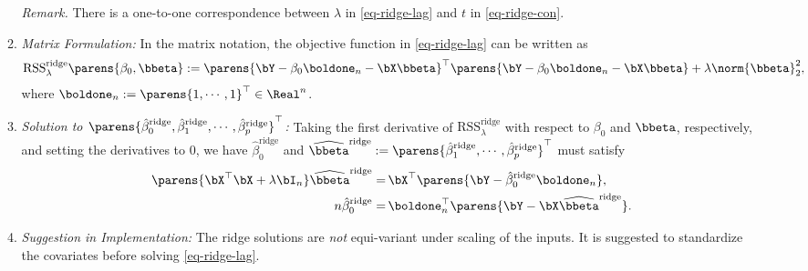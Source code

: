\documentclass[12pt]{article}
\begin{document}
\begin{enumerate}[label=\textbf{\arabic*.}]
\begin{enumerate}
		\textit{Remark.} There is a one-to-one correspondence between $\lambda$ in \eqref{eq-ridge-lag} and $t$ in \eqref{eq-ridge-con}. 
		
		\item \textit{Matrix Formulation:} In the matrix notation, the objective function in \eqref{eq-ridge-lag} can be written as 
		\begin{align}\label{eq-ridge-mat1}
			\mathrm{RSS}_{\lambda}^{\mathrm{ridge}} \parens{\beta_0, \bbeta} := \parens{\bY - \beta_0 \boldone_n - \bX \bbeta}^\top \parens{\bY - \beta_0 \boldone_n - \bX \bbeta} + \lambda \norm{\bbeta}_2^2, 
		\end{align}
		where $\boldone_n := \parens{1, \cdots, 1}^\top \in \Real^n$. 
		
		\item \textit{Solution to $\parens{\hat{\beta}^{\mathrm{ridge}}_0, \hat{\beta}^{\mathrm{ridge}}_1, \cdots, \hat{\beta}^{\mathrm{ridge}}_p}^\top$:} Taking the first derivative of $\mathrm{RSS}_{\lambda}^{\mathrm{ridge}}$ with respect to $\beta_0$ and $\bbeta$, respectively, and setting the derivatives to 0, we have $\hat{\beta}^{\mathrm{ridge}}_{0}$ and $\widehat{\bbeta}^{\mathrm{ridge}} := \parens{\hat{\beta}^{\mathrm{ridge}}_1, \cdots, \hat{\beta}^{\mathrm{ridge}}_p}^\top$ must satisfy  
		\begin{align}
			\parens{\bX^\top \bX + \lambda \bI_n} \widehat{\bbeta}^{\mathrm{ridge}} = & \, \bX^\top \parens{\bY - \hat{\beta}^{\mathrm{ridge}}_{0} \boldone_n}, \label{eq-ridgr-beta} \\ 
			n \hat{\beta}^{\mathrm{ridge}}_{0} = & \, \boldone_n^\top \parens{\bY - \bX \widehat{\bbeta}^{\mathrm{ridge}}}. \label{eq-ridge-beta0}
		\end{align}
		
		\item \textit{Suggestion in Implementation:} The ridge solutions are \emph{not} equi-variant under scaling of the inputs. It is suggested to standardize the covariates before solving \eqref{eq-ridge-lag}. 
		

\end{enumerate}
\end{enumerate}
\end{document}
